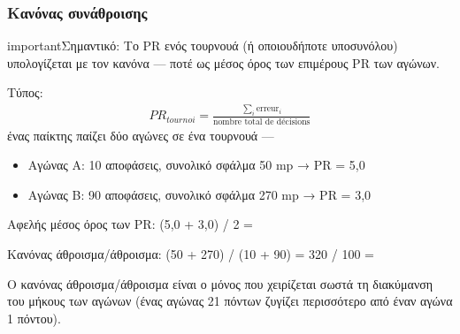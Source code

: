 \documentclass[letterpaper,10pt,greek]{sphinxmanual}
\begin{document}
\subsubsection{Κανόνας συνάθροισης}
\label{\detokenize{manuel:regle-d-agregation}}
\begin{sphinxadmonition}{important}{Σημαντικό:}
\sphinxAtStartPar
Το PR ενός τουρνουά (ή οποιουδήποτε υποσυνόλου) υπολογίζεται με τον κανόνα  — ποτέ ως μέσος όρος των επιμέρους PR των αγώνων.

\sphinxAtStartPar
Τύπος:
\begin{equation*}
\begin{split}PR_{tournoi} = \frac{\sum_{i} \text{erreur}_i}{\text{nombre total de décisions}}\end{split}
\end{equation*}
\sphinxAtStartPar
{} ένας παίκτης παίζει δύο αγώνες σε ένα τουρνουά —
\begin{itemize}
\item {} 
\sphinxAtStartPar
Αγώνας A: 10 αποφάσεις, συνολικό σφάλμα 50 mp → PR = 5,0

\item {} 
\sphinxAtStartPar
Αγώνας B: 90 αποφάσεις, συνολικό σφάλμα 270 mp → PR = 3,0

\end{itemize}

\sphinxAtStartPar
Αφελής μέσος όρος των PR: (5,0 + 3,0) / 2 =  

\sphinxAtStartPar
Κανόνας άθροισμα/άθροισμα: (50 + 270) / (10 + 90) = 320 / 100 =  

\sphinxAtStartPar
Ο κανόνας άθροισμα/άθροισμα είναι ο μόνος που χειρίζεται σωστά τη διακύμανση του μήκους των αγώνων (ένας αγώνας 21 πόντων ζυγίζει περισσότερο από έναν αγώνα 1 πόντου).
\end{sphinxadmonition}
\end{document}
